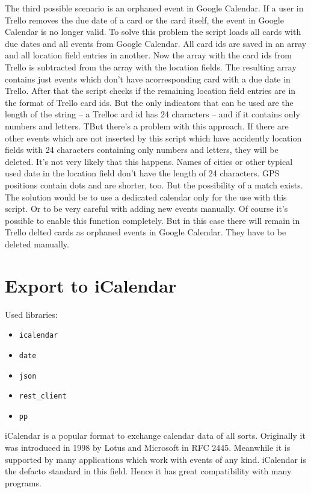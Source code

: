 The third possible scenario is an orphaned event in Google Calendar. If a user in Trello removes the due date of a card or the card itself, the event in Google Calendar is no longer valid. To solve this problem the script loads all cards with due dates and all events from Google Calendar. All card ids are saved in an array and all location field entries in another. Now the array with the card ids from Trello is subtracted from the array with the location fields. The resulting array contains just events which don't have acorresponding card with a due date in Trello. After that the script checks if the remaining location field entries are in the format of Trello card ids. But the only indicators that can be used are the length of the string – a Trelloc ard id has 24 characters – and if it contains only numbers and letters. TBut there's a problem with this approach. If there are other events which are not inserted by this script which have accidently location fields with 24 characters containing only numbers and letters, they will be deleted. It's not very likely that this happens. Names of cities or other typical used date in the location field don't have the length of 24 characters. GPS positions contain dots and are shorter, too. But the possibility of a match exists. The solution would be to use a dedicated calendar only for the use with this script. Or to be very careful with adding new events manually. Of course it's possible to enable this function completely. But in this case there will remain in Trello delted cards as orphaned events in Google Calendar. They have to be deleted manually.

\section{Export to iCalendar}

Used libraries:
\begin{itemize}
	\item \texttt{icalendar}
	\item \texttt{date}
	\item \texttt{json}
	\item \texttt{rest\_client}
	\item \texttt{pp}
\end{itemize}

iCalendar is a popular format to exchange calendar data of all sorts. Originally it was introduced in 1998 by Lotus and Microsoft in RFC 2445. \cite{rfc:2445} Meanwhile it is supported by many applications which work with events of any kind. iCalendar is the defacto standard in this field. Hence it has great compatibility with many programs. 

